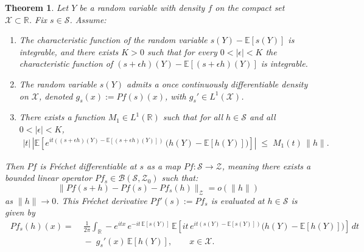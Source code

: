 \documentclass[12pt,leqno]{amsart}
\newtheorem{theorem}{Theorem}
\newtheorem{corollary}{Corollary}
\begin{document}
\begin{theorem}\label{thm: PF1deriv}
Let $Y$ be a random variable with density $f$ on the compact set $\mathcal{X}\subset\mathbb R$.
Fix $s\in\mathcal{S}$. Assume:

\begin{enumerate}[label=(A\arabic*),itemsep=0.4em]
\item
The characteristic function of the random variable $s(Y)-\mathbb E[s(Y)]$ is integrable, and there exists $K>0$ such that for every
$0<|\epsilon|<K$ the characteristic function of $(s+\epsilon h)(Y)-\mathbb E[(s+\epsilon h)(Y)]$ is integrable.

\item
The random variable $s(Y)$ admits a once continuously differentiable density on $\mathcal{X}$, denoted
$g_s(x):=Pf(s)(x)$, with $g_s'\in L^1(\mathcal{X})$.

\item
There exists a function $M_1\in L^1(\mathbb R)$ such that for all $h\in\mathcal{S}$ and all $0<|\epsilon|<K$,
\begin{align}\label{eq:M1_dom}
|t|\,
\left|
\mathbb E\!\left[
e^{it\left((s+\epsilon h)(Y)-\mathbb E[(s+\epsilon h)(Y)]\right)}\,
\big(h(Y)-\mathbb E[h(Y)]\big)
\right]
\right|
\;\le\; M_1(t)\,\|h\|.
\end{align}
\end{enumerate}
Then $Pf$ is Fr\'echet differentiable at $s$ as a map $Pf:\mathcal{S}\to\mathcal{Z}$, meaning there exists a bounded linear operator $Pf_s \in \mathcal{B}(\mathcal{S},\mathcal{Z}_0)$ such that:
\[
\|Pf(s+h) - Pf(s) - Pf_s(h)\|_{\mathcal{Z}} = o(\|h\|)
\]
as $\|h\| \to 0$. This Fr\'echet derivative $Pf'(s) := Pf_s$ is evaluated at $h\in\mathcal{S}$ is given by
\begin{align}~\label{eq:first-var}
Pf_s(h)(x)
=&\;\frac{1}{2\pi}\int_{\mathbb R} -e^{itx}\,e^{-it\,\mathbb E[s(Y)]}\,
\mathbb E\!\left[
it\,e^{it(s(Y)-\mathbb E[s(Y)])}\big(h(Y)-\mathbb E[h(Y)]\big)
\right]\,dt\\
&\;-\;g_s'(x)\,\mathbb E[h(Y)] ,
\qquad x\in\mathcal{X}.
\end{align}
\end{theorem}

\end{document}
